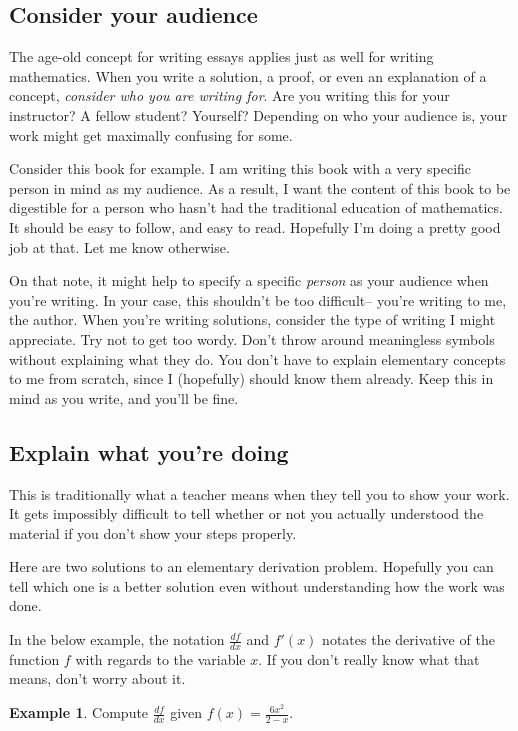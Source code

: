 \documentclass{scrbook}
\theoremstyle{definition}
\newtheorem{example}{Example}
\begin{document}
\subsection{Consider your audience}

The age-old concept for writing essays applies just as well for writing mathematics. When you write a solution, a proof, or even an explanation of a concept, \textit{consider who you are writing for}. Are you writing this for your instructor? A fellow student? Yourself? Depending on who your audience is, your work might get maximally confusing for some. 

Consider this book for example. I am writing this book with a very specific person in mind as my audience. As a result, I want the content of this book to be digestible for a person who hasn't had the traditional education of mathematics. It should be easy to follow, and easy to read. Hopefully I'm doing a pretty good job at that. Let me know otherwise.

On that note, it might help to specify a specific \textit{person} as your audience when you're writing. In your case, this shouldn't be too difficult-- you're writing to me, the author. When you're writing solutions, consider the type of writing I might appreciate. Try not to get too wordy. Don't throw around meaningless symbols without explaining what they do. You don't have to explain elementary concepts to me from scratch, since I (hopefully) should know them already. Keep this in mind as you write, and you'll be fine.

\subsection{Explain what you're doing}

This is traditionally what a teacher means when they tell you to show your work. It gets impossibly difficult to tell whether or not you actually understood the material if you don't show your steps properly. 

Here are two solutions to an elementary derivation problem. Hopefully you can tell which one is a better solution even without understanding how the work was done. 

In the below example, the notation $\frac{df}{dx}$ and $f'(x)$ notates the derivative of the function $f$ with regards to the variable $x$. If you don't really know what that means, don't worry about it.

\begin{example}
Compute $\frac{df}{dx}$ given $f(x) = \frac{6x^2}{2-x}$.
\end{example}
\end{document}
